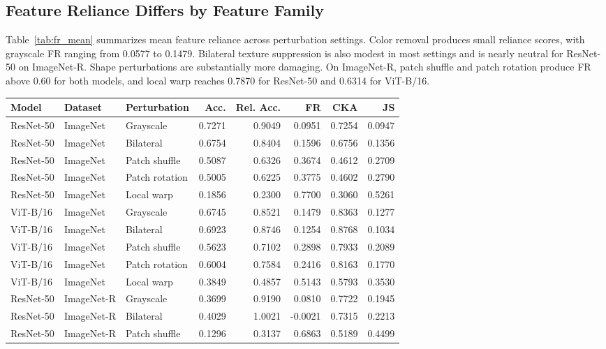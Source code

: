 \documentclass[letterpaper]{article}
\begin{document}
\subsection{Feature Reliance Differs by Feature Family}

Table~\ref{tab:fr_mean} summarizes mean feature reliance across perturbation
settings. Color removal produces small reliance scores, with grayscale FR
ranging from 0.0577 to 0.1479. Bilateral texture suppression is also modest in
most settings and is nearly neutral for ResNet-50 on ImageNet-R. Shape
perturbations are substantially more damaging. On ImageNet-R, patch shuffle and
patch rotation produce FR above 0.60 for both models, and local warp reaches
0.7870 for ResNet-50 and 0.6314 for ViT-B/16.

\begin{table}[t]
\centering
\small
\begin{tabular}{lllrrrrr}
\toprule
Model & Dataset & Perturbation & Acc. & Rel. Acc. & FR & CKA & JS \\
\midrule
ResNet-50 & ImageNet & Grayscale & 0.7271 & 0.9049 & 0.0951 & 0.7254 & 0.0947 \\
ResNet-50 & ImageNet & Bilateral & 0.6754 & 0.8404 & 0.1596 & 0.6756 & 0.1356 \\
ResNet-50 & ImageNet & Patch shuffle & 0.5087 & 0.6326 & 0.3674 & 0.4612 & 0.2709 \\
ResNet-50 & ImageNet & Patch rotation & 0.5005 & 0.6225 & 0.3775 & 0.4602 & 0.2790 \\
ResNet-50 & ImageNet & Local warp & 0.1856 & 0.2300 & 0.7700 & 0.3060 & 0.5261 \\
\midrule
ViT-B/16 & ImageNet & Grayscale & 0.6745 & 0.8521 & 0.1479 & 0.8363 & 0.1277 \\
ViT-B/16 & ImageNet & Bilateral & 0.6923 & 0.8746 & 0.1254 & 0.8768 & 0.1034 \\
ViT-B/16 & ImageNet & Patch shuffle & 0.5623 & 0.7102 & 0.2898 & 0.7933 & 0.2089 \\
ViT-B/16 & ImageNet & Patch rotation & 0.6004 & 0.7584 & 0.2416 & 0.8163 & 0.1770 \\
ViT-B/16 & ImageNet & Local warp & 0.3849 & 0.4857 & 0.5143 & 0.5793 & 0.3530 \\
\midrule
ResNet-50 & ImageNet-R & Grayscale & 0.3699 & 0.9190 & 0.0810 & 0.7722 & 0.1945 \\
ResNet-50 & ImageNet-R & Bilateral & 0.4029 & 1.0021 & -0.0021 & 0.7315 & 0.2213 \\
ResNet-50 & ImageNet-R & Patch shuffle & 0.1296 & 0.3137 & 0.6863 & 0.5189 & 0.4499 \\

\end{tabular}
\end{table}
\end{document}
